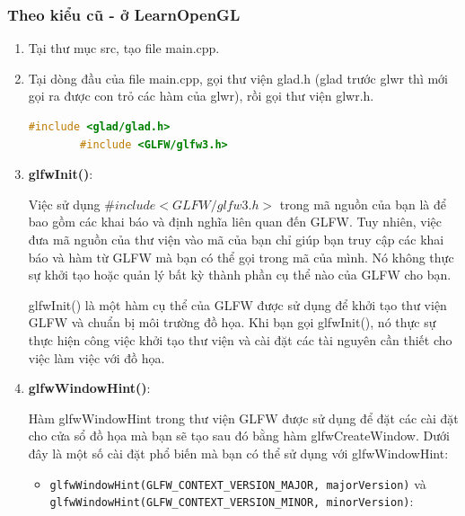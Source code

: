 \subsubsection{Theo kiểu cũ - ở LearnOpenGL}
\begin{enumerate}
    \item Tại thư mục src, tạo file main.cpp.
    \item Tại dòng đầu của file main.cpp, gọi thư viện glad.h (glad trước glwr
     thì mới gọi ra được con trỏ các hàm của glwr), rồi gọi thư viện glwr.h.

    \begin{lstlisting}[language=C++]
        #include <glad/glad.h>
        #include <GLFW/glfw3.h>
    \end{lstlisting}

    \item \textbf{glfwInit()}:

    Việc sử dụng ${\#include <GLFW/glfw3.h>}$ trong mã nguồn của bạn là để
     bao gồm các khai báo và định nghĩa liên quan đến GLFW. Tuy nhiên,
      việc đưa mã nguồn của thư viện vào mã của bạn chỉ
     giúp bạn truy cập các khai báo và hàm từ GLFW mà bạn có thể gọi 
     trong mã của mình. Nó không thực sự khởi tạo hoặc quản lý bất kỳ
      thành phần cụ thể nào của GLFW cho bạn.

      glfwInit() là một hàm cụ thể của GLFW được sử dụng để khởi tạo thư 
      viện GLFW và chuẩn bị môi trường đồ họa. Khi bạn gọi glfwInit(), nó 
      thực sự thực hiện công việc khởi tạo thư viện và cài đặt các
       tài nguyên cần thiết cho việc làm việc với đồ họa.  

    \item \textbf{glfwWindowHint()}:
 
    Hàm glfwWindowHint trong thư viện GLFW được sử dụng để đặt các 
    cài đặt cho cửa sổ đồ họa mà bạn sẽ tạo sau đó bằng hàm glfwCreateWindow.
     Dưới đây là một số cài đặt phổ biến mà bạn có thể sử dụng với glfwWindowHint:
    
\begin{itemize}
    \item \texttt{glfwWindowHint(GLFW\_CONTEXT\_VERSION\_MAJOR, majorVersion)}
      và \\
      \texttt{glfwWindowHint(GLFW\_CONTEXT\_VERSION\_MINOR, minorVersion)}:
      

\end{itemize}
\end{enumerate}
